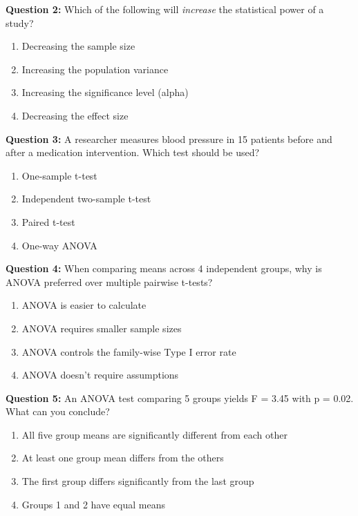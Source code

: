 \documentclass[11pt]{article}
\begin{document}
\vspace{0.5cm}

\textbf{Question 2:} Which of the following will \textit{increase} the statistical power of a study?

\begin{enumerate}[label=\Alph*.]
\item Decreasing the sample size
\item Increasing the population variance
\item Increasing the significance level (alpha)
\item Decreasing the effect size
\end{enumerate}

\vspace{0.5cm}

\textbf{Question 3:} A researcher measures blood pressure in 15 patients before and after a medication intervention. Which test should be used?

\begin{enumerate}[label=\Alph*.]
\item One-sample t-test
\item Independent two-sample t-test
\item Paired t-test
\item One-way ANOVA
\end{enumerate}

\vspace{0.5cm}

\textbf{Question 4:} When comparing means across 4 independent groups, why is ANOVA preferred over multiple pairwise t-tests?

\begin{enumerate}[label=\Alph*.]
\item ANOVA is easier to calculate
\item ANOVA requires smaller sample sizes
\item ANOVA controls the family-wise Type I error rate
\item ANOVA doesn't require assumptions
\end{enumerate}

\vspace{0.5cm}

\textbf{Question 5:} An ANOVA test comparing 5 groups yields F = 3.45 with p = 0.02. What can you conclude?

\begin{enumerate}[label=\Alph*.]
\item All five group means are significantly different from each other
\item At least one group mean differs from the others
\item The first group differs significantly from the last group
\item Groups 1 and 2 have equal means
\end{enumerate}
\end{document}
